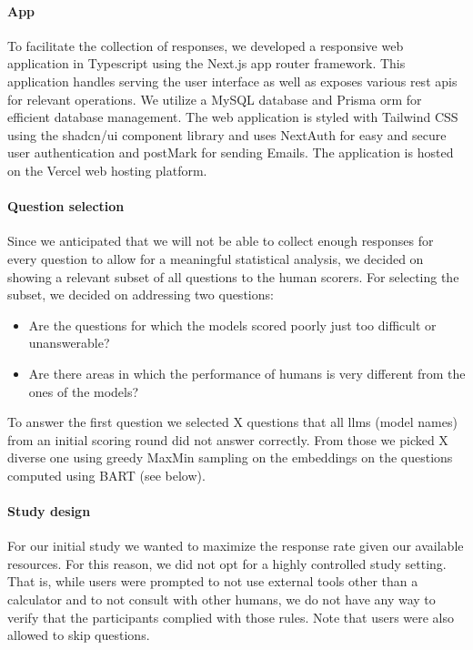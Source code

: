 \documentclass[11pt, oneside]{article}
\begin{document}
\paragraph{App} To facilitate the collection of responses, we developed a responsive web application in Typescript using the Next.js\cite{nextjs} app router framework. 
This application handles serving the user interface as well as exposes various \gls{rest} \glspl{api} for relevant operations. 
We utilize a MySQL\cite{mysql} database and Prisma \gls{orm}\cite{prisma} for efficient database management. 
The web application is styled with Tailwind CSS\cite{tailwindcss} using the shadcn/ui component library and uses NextAuth\cite{nextauth} for easy and secure user authentication and postMark for sending Emails.
The application is hosted on the Vercel web hosting platform. 

\paragraph{Question selection}
Since we anticipated that we will not be able to collect enough responses for every question to allow for a meaningful statistical analysis, we decided on showing a relevant subset of all questions to the human scorers. 
For selecting the subset, we decided on addressing two questions: 
\begin{itemize}
    \item Are the questions for which the models scored poorly just too difficult or unanswerable? 
    \item Are there areas in which the performance of humans is very different from the ones of the models? 
\end{itemize}
To answer the first question we selected X questions that all \glspl{llm} (model names) from an initial scoring round did not answer correctly. 
From those we picked X diverse one using greedy MaxMin sampling on the embeddings on the questions computed using BART (see below). 


\paragraph{Study design} 
For our initial study we wanted to maximize the response rate given our available resources. For this reason, we did not opt for a highly controlled study setting. That is, while users were prompted to not use external tools other than a calculator and to not consult with other humans, we do not have any way to verify that the participants complied with those rules. Note that users were also allowed to skip questions.
\end{document}
